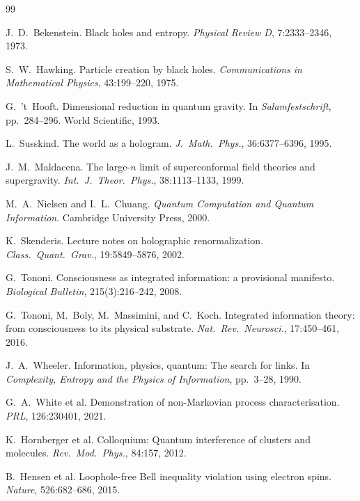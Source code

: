 \documentclass[12pt,oneside]{book}
\theoremstyle{definition}
\begin{document}
\begin{thebibliography}{99}

  J.~D.~Bekenstein. Black holes and entropy.
  \textit{Physical Review D}, 7:2333--2346, 1973.

  S.~W.~Hawking. Particle creation by black holes.
  \textit{Communications in Mathematical Physics}, 43:199--220, 1975.

  G.~'t~Hooft. Dimensional reduction in quantum gravity.
  In \textit{Salamfestschrift}, pp.~284--296. World Scientific, 1993.

  L.~Susskind. The world as a hologram.
  \textit{J.~Math.\ Phys.}, 36:6377--6396, 1995.

  J.~M.~Maldacena. The large-$n$ limit of superconformal field theories and supergravity.
  \textit{Int.\ J.\ Theor.\ Phys.}, 38:1113--1133, 1999.

  M.~A.~Nielsen and I.~L.~Chuang.
  \textit{Quantum Computation and Quantum Information}.
  Cambridge University Press, 2000.

  K.~Skenderis. Lecture notes on holographic renormalization.
  \textit{Class.\ Quant.\ Grav.}, 19:5849--5876, 2002.

  G.~Tononi. Consciousness as integrated information: a provisional manifesto.
  \textit{Biological Bulletin}, 215(3):216--242, 2008.

  G.~Tononi, M.~Boly, M.~Massimini, and C.~Koch.
  Integrated information theory: from consciousness to its physical substrate.
  \textit{Nat.\ Rev.\ Neurosci.}, 17:450--461, 2016.

  J.~A.~Wheeler. Information, physics, quantum: The search for links.
  In \textit{Complexity, Entropy and the Physics of Information}, pp.~3--28, 1990.

  G.~A.~White et al. Demonstration of non-Markovian process characterisation.
  \textit{PRL}, 126:230401, 2021.

  K.~Hornberger et al. Colloquium: Quantum interference of clusters and molecules.
  \textit{Rev.\ Mod.\ Phys.}, 84:157, 2012.

  B.~Hensen et al. Loophole-free Bell inequality violation using electron spins.
  \textit{Nature}, 526:682--686, 2015.


\end{thebibliography}
\end{document}
